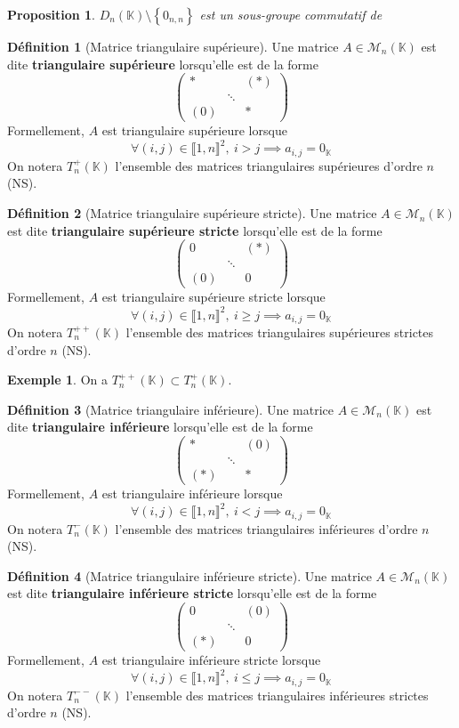 \documentclass[french]{book}
\newcommand{\K}{\mathbb{K}}
\theoremstyle{plain}
\newtheorem{prop}{Proposition}[chapter]
\theoremstyle{definition}
\newtheorem{dfn}{Définition}[chapter]
\newtheorem{exa}{Exemple}[chapter]
\theoremstyle{remark}
\begin{document}
\begin{prop}
	$D_n(\K)\setminus\left\{0_{n,n}\right\}$ est un sous-groupe commutatif de 
\end{prop}
\begin{dfn}[Matrice triangulaire supérieure]
	Une matrice $A\in\mathcal{M}_n(\K)$ est dite \textbf{triangulaire supérieure} lorsqu'elle est de la forme $$\begin{pmatrix}*&&(*)\\&\ddots&\\ (0)&&*\end{pmatrix}$$ Formellement, $A$ est triangulaire supérieure lorsque $$\forall(i,j)\in\llbracket1,n\rrbracket^2,\ i>j\implies a_{i,j}=0_\K$$ On notera $T_n^+(\K)$ l'ensemble des matrices triangulaires supérieures d'ordre $n$ (NS).
\end{dfn}
\begin{dfn}[Matrice triangulaire supérieure stricte]
	Une matrice $A\in\mathcal{M}_n(\K)$ est dite \textbf{triangulaire supérieure stricte} lorsqu'elle est de la forme $$\begin{pmatrix}0&&(*)\\&\ddots&\\ (0)&&0\end{pmatrix}$$ Formellement, $A$ est triangulaire supérieure stricte lorsque $$\forall(i,j)\in\llbracket1,n\rrbracket^2,\ i\geqslant j\implies a_{i,j}=0_\K$$ On notera $T_n^{++}(\K)$ l'ensemble des matrices triangulaires supérieures strictes d'ordre $n$ (NS).
\end{dfn}
\begin{exa}
	On a $T_n^{++}(\K)\subset T_n^+(\K)$.
\end{exa}
\begin{dfn}[Matrice triangulaire inférieure]
	Une matrice $A\in\mathcal{M}_n(\K)$ est dite \textbf{triangulaire inférieure} lorsqu'elle est de la forme $$\begin{pmatrix}*&&(0)\\&\ddots&\\ (*)&&*\end{pmatrix}$$ Formellement, $A$ est triangulaire inférieure lorsque $$\forall(i,j)\in\llbracket1,n\rrbracket^2,\ i<j\implies a_{i,j}=0_\K$$ On notera $T_n^-(\K)$ l'ensemble des matrices triangulaires inférieures d'ordre $n$ (NS).
\end{dfn}
\begin{dfn}[Matrice triangulaire inférieure stricte]
	Une matrice $A\in\mathcal{M}_n(\K)$ est dite \textbf{triangulaire inférieure stricte} lorsqu'elle est de la forme $$\begin{pmatrix}0&&(0)\\&\ddots&\\ (*)&&0\end{pmatrix}$$ Formellement, $A$ est triangulaire inférieure stricte lorsque $$\forall(i,j)\in\llbracket1,n\rrbracket^2,\ i\leqslant j\implies a_{i,j}=0_\K$$ On notera $T_n^{--}(\K)$ l'ensemble des matrices triangulaires inférieures strictes d'ordre $n$ (NS).
\end{dfn}
\end{document}
